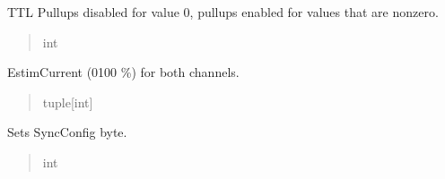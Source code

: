 \documentclass[letterpaper,10pt,english]{sphinxmanual}
\begin{document}
\begin{fulllineitems}
\begin{fulllineitems}
\begin{quote}
\begin{description}
\end{description}\end{quote}

\end{fulllineitems}


\begin{fulllineitems}
\label{\detokenize{Morelia.Parameters:Morelia.Parameters.Params8480SC.Params8480SC.ttlPUllups}}
\pysigstartsignatures
{}
\pysigstopsignatures
\sphinxAtStartPar
TTL Pullups disabled for value 0, pullups enabled for values that are non\sphinxhyphen{}zero.
\begin{quote}\begin{description}
\sphinxAtStartPar
int

\end{description}\end{quote}

\end{fulllineitems}


\begin{fulllineitems}
\label{\detokenize{Morelia.Parameters:Morelia.Parameters.Params8480SC.Params8480SC.estimCurrent}}
\pysigstartsignatures
{}
\pysigstopsignatures
\sphinxAtStartPar
Estim\sphinxhyphen{}Current (0\sphinxhyphen{}100 \%) for both channels.
\begin{quote}\begin{description}
\sphinxAtStartPar
tuple{[}int{]}

\end{description}\end{quote}

\end{fulllineitems}


\begin{fulllineitems}
\label{\detokenize{Morelia.Parameters:Morelia.Parameters.Params8480SC.Params8480SC.syncConfig}}
\pysigstartsignatures
{}
\pysigstopsignatures
\sphinxAtStartPar
Sets Sync\sphinxhyphen{}Config byte.
\begin{quote}\begin{description}
\sphinxAtStartPar
int


\end{description}
\end{quote}
\end{fulllineitems}
\end{fulllineitems}
\end{document}
